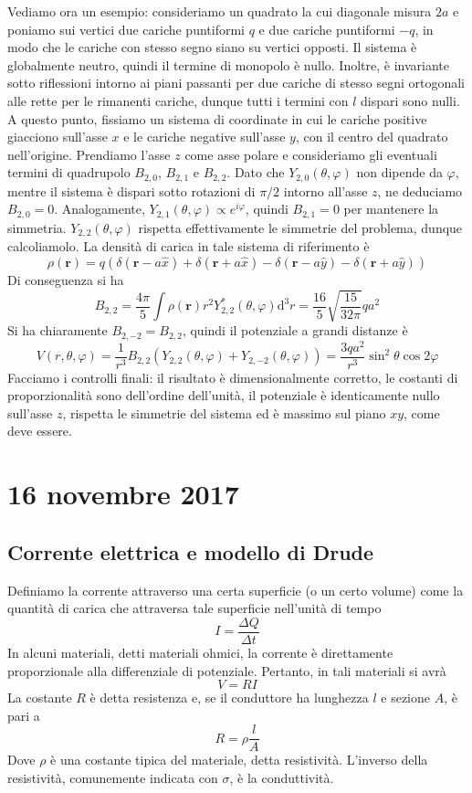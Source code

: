 \documentclass[a4paper,11pt]{book}
\newcommand{\dif}{\mathrm{d}}
\renewcommand{\vec}[1]{\mathbf{#1}}
\theoremstyle{theorem}
\theoremstyle{definition}
\begin{document}
Vediamo ora un esempio: consideriamo un quadrato la cui diagonale misura $2a$ e poniamo sui vertici due cariche puntiformi $q$ e due cariche puntiformi $-q$, in modo che le cariche con stesso segno siano su vertici opposti. Il sistema è globalmente neutro, quindi il termine di monopolo è nullo. Inoltre, è invariante sotto riflessioni intorno ai piani passanti per due cariche di stesso segni ortogonali alle rette per le rimanenti cariche, dunque tutti i termini con $l$ dispari sono nulli. A questo punto, fissiamo un sistema di coordinate in cui le cariche positive giacciono sull'asse $x$ e le cariche negative sull'asse $y$, con il centro del quadrato nell'origine. Prendiamo l'asse $z$ come asse polare e consideriamo gli eventuali termini di quadrupolo $B_{2,0}$, $B_{2,1}$ e $B_{2,2}$. Dato che $Y_{2,0}(\theta,\varphi)$ non dipende da $\varphi$, mentre il sistema è dispari sotto rotazioni di $\pi/2$ intorno all'asse $z$, ne deduciamo $B_{2,0}=0$. Analogamente, $Y_{2,1}(\theta,\varphi)\propto e^{i\varphi}$, quindi $B_{2,1}=0$ per mantenere la simmetria. $Y_{2,2}(\theta,\varphi)$ rispetta effettivamente le simmetrie del problema, dunque calcoliamolo. La densità di carica in tale sistema di riferimento è
\[\rho(\vec{r})=q\left(\delta(\vec{r}-a\hat{x})+\delta(\vec{r}+a\hat{x})-\delta(\vec{r}-a\hat{y})-\delta(\vec{r}+a\hat{y})\right)\]
Di conseguenza si ha
\[B_{2,2}=\frac{4\pi}{5}\int\rho(\vec{r})r^2Y^*_{2,2}(\theta,\varphi)\dif^3r=\frac{16}{5}\sqrt{\frac{15}{32\pi}}qa^2\]
Si ha chiaramente $B_{2,-2}=B_{2,2}$, quindi il potenziale a grandi distanze è
\[V(r,\theta,\varphi)=\frac{1}{r^3}B_{2,2}\left(Y_{2,2}(\theta,\varphi)+Y_{2,-2}(\theta,\varphi)\right)=\frac{3qa^2}{r^3}\sin^2\theta\cos2\varphi\]
Facciamo i controlli finali: il risultato è dimensionalmente corretto, le costanti di proporzionalità sono dell'ordine dell'unità, il potenziale è identicamente nullo sull'asse $z$, rispetta le simmetrie del sistema ed è massimo sul piano $xy$, come deve essere.
\newpage
\section{16 novembre 2017}
\subsection{Corrente elettrica e modello di Drude}
Definiamo la corrente attraverso una certa superficie (o un certo volume) come la quantità di carica che attraversa tale superficie nell'unità di tempo
\[I=\frac{\Delta Q}{\Delta t}\]
In alcuni materiali, detti materiali ohmici, la corrente è direttamente proporzionale alla differenziale di potenziale. Pertanto, in tali materiali si avrà
\[V=RI\]
La costante $R$ è detta resistenza e, se il conduttore ha lunghezza $l$ e sezione $A$, è pari a
\[R=\rho\frac{l}{A}\]
Dove $\rho$ è una costante tipica del materiale, detta resistività. L'inverso della resistività, comunemente indicata con $\sigma$, è la conduttività.
\end{document}
